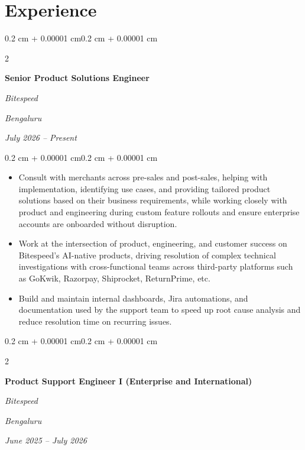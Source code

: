 \documentclass[10pt, letterpaper]{article}
\newenvironment{highlights}{
    \begin{itemize}[
        topsep=0.10 cm,
        parsep=0.10 cm,
        partopsep=0pt,
        itemsep=0pt,
        leftmargin=0.4 cm + 10pt
    ]
}{
    \end{itemize}
}
\newenvironment{onecolentry}{
    \begin{adjustwidth}{0.2 cm + 0.00001 cm}{0.2 cm + 0.00001 cm}
}{
    \end{adjustwidth}
}
\newenvironment{twocolentry}[2][]{
    \onecolentry
    \def\secondColumn{#2}
    \setcolumnwidth{\fill, 4.5 cm}
    \begin{paracol}{2}
}{
    \switchcolumn \raggedleft \secondColumn
    \end{paracol}
    \endonecolentry
}
\begin{document}
    \vspace{-0.40 cm}


    \section{Experience}

    \begin{twocolentry}{
        \textit{Bengaluru}

        \textit{July 2026 -- Present}
    }
        \textbf{Senior Product Solutions Engineer}

        \textit{Bitespeed}
    \end{twocolentry}

    \vspace{0.10 cm}
    \begin{onecolentry}
        \begin{highlights}
            \item Consult with merchants across pre-sales and post-sales, helping with implementation, identifying use cases, and providing tailored product solutions based on their business requirements, while working closely with product and engineering during custom feature rollouts and ensure enterprise accounts are onboarded without disruption.
            \item Work at the intersection of product, engineering, and customer success on Bitespeed's AI-native products, driving resolution of complex technical investigations with cross-functional teams across third-party platforms such as GoKwik, Razorpay, Shiprocket, ReturnPrime, etc.
            \item Build and maintain internal dashboards, Jira automations, and documentation used by the support team to speed up root cause analysis and reduce resolution time on recurring issues.
        \end{highlights}
    \end{onecolentry}

    \vspace{0.2 cm}

    \begin{twocolentry}{
        \textit{Bengaluru}

        \textit{June 2025 -- July 2026}
    }
        \textbf{Product Support Engineer I (Enterprise and International)}

        \textit{Bitespeed}
    \end{twocolentry}
\end{document}
